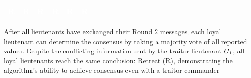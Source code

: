 \begin{center}
\begin{tabular}{c|c|c|c|c|c}
    \hline
    \hline
    \cellcolor{red!45}\textbf{\textcolor{white}{R}} & \cellcolor{red!75}\textbf{\textcolor{white}{R}} & \cellcolor{red!75}\textbf{\textcolor{white}{R}} & \cellcolor{red!75}\textbf{\textcolor{white}{R}} & \cellcolor{red!75}\textbf{\textcolor{white}{R}} & \cellcolor{red!75}\textbf{\textcolor{white}{R}} \\
\end{tabular}
\par\vspace{0.3em}
{\scriptsize
After all lieutenants have exchanged their Round 2 messages, each loyal lieutenant can determine the consensus by taking a majority vote of all reported values. Despite the conflicting information sent by the traitor lieutenant $G_{1}$, all loyal lieutenants reach the same conclusion: Retreat (R), demonstrating the algorithm's ability to achieve consensus even with a traitor commander.
}
\end{center}
